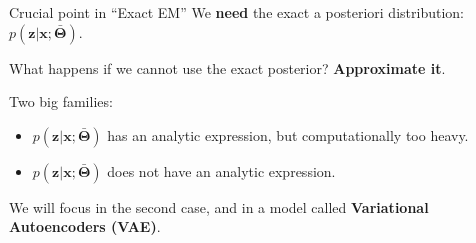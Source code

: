 \documentclass{beamer}
\newcommand{\bs}[1]{\boldsymbol{#1}}
\begin{document}
\begin{frame}{Crucial point in ``Exact EM''}
 We \textbf{need} the exact a posteriori distribution: $p(\bs{z}|\bs{x};\bar{\bs{\Theta}})$.\vspace{3mm}
 
 What happens if we cannot use the exact posterior? \textbf{Approximate it}.\vspace{3mm}

 Two big families:
 \begin{itemize}
  \item $p(\bs{z}|\bs{x};\bar{\bs{\Theta}})$ has an analytic expression, but computationally too heavy.
  \item $p(\bs{z}|\bs{x};\bar{\bs{\Theta}})$ does not have an analytic expression.
 \end{itemize}\vspace{3mm}
 
 We will focus in the second case, and in a model called \textbf{Variational Autoencoders (VAE)}.
 

\end{frame}
\end{document}
